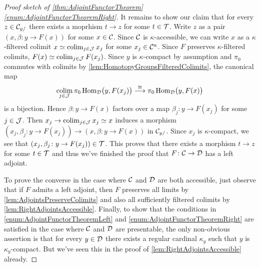 \begin{proof}[Proof sketch of \cref{thm:AdjointFunctorTheorem}\cref{enum:AdjointFunctorTheoremRight}]
	It remains to show our claim that for every $z\in\mathcal{C}_{y/}$ there exists a moprhism $t\rightarrow z$ for some $t\in\mathcal{T}$. Write $z$ as a pair $(x,\beta\colon y\rightarrow F(x))$ for some $x\in \mathcal{C}$. Since $\mathcal{C}$ is $\kappa$-accessible, we can write $x$ as a $\kappa$-filtered colimit $x\simeq \operatorname*{colim}_{j\in\mathcal{J}}x_j$ for some $x_j\in \mathcal{C}^\kappa$. Since $F$ preserves $\kappa$-filtered colimits, $F(x)\simeq \operatorname*{colim}_{j\in\mathcal{J}}F(x_j)$. Since $y$ is $\kappa$-compact by assumption and $\pi_0$ commutes with colimits by \cref{lem:HomotopyGroupsFilteredColimits}, the canonical map
	\begin{equation*}
		\colimit_{j\in\Jj}\pi_0\Hom_\Dd\lef(y,F(x_j)\righ)\overset{\cong}{\longrightarrow}\pi_0\Hom_\Dd\lef(y,F(x)\righ)
	\end{equation*}
	is a bijection. Hence $\beta\colon y\rightarrow F(x)$ factors over a map $\beta_j\colon y\rightarrow F(x_j)$ for some $j\in\mathcal{J}$. Then $x_j\rightarrow\operatorname*{colim}_{j\in\mathcal{J}}x_j\simeq x$ induces a morphism $(x_j,\beta_j\colon y\rightarrow F( x_j))\rightarrow (x,\beta\colon y\rightarrow F(x))$ in $\mathcal{C}_{y/}$. Since $x_j$ is $\kappa$-compact, we see that $(x_j,\beta_j\colon y\rightarrow F( x_j))\in\mathcal{T}$. This proves that there exists a morphism $t\rightarrow z$ for some $t\in\mathcal{T}$ and thus we've finished the proof that $F\colon \mathcal{C}\rightarrow \mathcal{D}$ has a left adjoint.
	
	To prove the converse in the case where $\mathcal{C}$ and $\mathcal{D}$ are both accessible, just observe that if $F$ admits a left adjoint, then $F$ preserves all limits by \cref{lem:AdjointsPreserveColimits} and also all sufficiently filtered colimits by \cref{lem:RightAdjointsAccessible}. Finally, to show that the conditions in \cref{enum:AdjointFunctorTheoremLeft} and \cref{enum:AdjointFunctorTheoremRight} are satisfied in the case where $\mathcal{C}$ and $\mathcal{D}$ are presentable, the only non-obvious assertion is that for every $y\in\mathcal{D}$ there exists a regular cardinal $\kappa_y$ such that $y$ is $\kappa_y$-compact. But we've seen this in the proof of \cref{lem:RightAdjointsAccessible} already.
\end{proof}